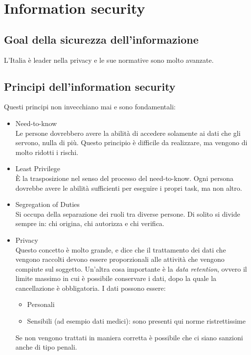 \chapter{Information security}

\section{Goal della sicurezza dell'informazione}

L'Italia è leader nella privacy e le sue normative sono molto avanzate.

\section{Principi dell'information security}

Questi principi non invecchiano mai e sono fondamentali:
\begin{itemize}
  \item Need-to-know \\
  Le persone dovrebbero avere la abilità di accedere solamente ai dati che gli 
  servono, nulla di più. Questo principio è difficile da realizzare, ma vengono 
  di molto ridotti i rischi.
  \item Least Privilege \\
  È la trasposizione nel senso del processo del need-to-know. Ogni persona 
  dovrebbe avere le abilità sufficienti per eseguire i propri task, ma non 
  altro.
  \item Segregation of Duties \\
  Si occupa della separazione dei ruoli tra diverse persone. Di solito si 
  divide sempre in: chi origina, chi autorizza e chi verifica.
  \item Privacy \\
  Questo concetto è molto grande, e dice che il trattamento dei dati che 
  vengono raccolti devono essere proporzionali alle attività che vengono 
  compiute sul soggetto. Un'altra cosa importante è la \textit{data retention}, 
  ovvero il limite massimo in cui è possibile conservare i dati, dopo la quale 
  la cancellazione è obbligatoria. I dati possono essere:
  \begin{itemize}
    \item Personali
    \item Sensibili (ad esempio dati medici): sono presenti qui norme 
    ristrettissime
  \end{itemize}
  Se non vengono trattati in maniera corretta è possibile che ci siano sanzioni 
  anche di tipo penali.
\end{itemize}

